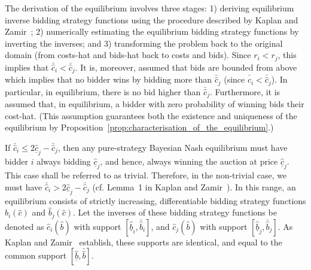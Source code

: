 The derivation of the equilibrium involves three stages: 1) deriving equilibrium inverse bidding strategy functions using the procedure described by Kaplan and Zamir~\cite{KaplanZamir2007}; 2) numerically estimating the equilibrium bidding strategy functions by inverting the inverses; and 3) transforming the problem back to the original domain (from costs-hat and bids-hat back to costs and bids). Since $r_i < r_j$, this implies that $\bar{\hat{c}}_i < \bar{\hat{c}}_j$. It is, moreover, assumed that bids are bounded from above which implies that no bidder wins by bidding more than $\bar{\hat{c}}_j$ (since $\bar{\hat{c}}_i < \bar{\hat{c}}_j$). In particular, in equilibrium, there is no bid higher than $\bar{\hat{c}}_j$. Furthermore, it is assumed that, in equilibrium, a bidder with zero probability of winning bids their cost-hat. (This assumption guarantees both the existence and uniqueness of the equilibrium by Proposition~\ref{prop:characterisation_of_the_equilibrium}.)

If $\bar{\hat{c}}_i \le 2\underline{\hat{c}}_j - \bar{\hat{c}}_j$, then any pure-strategy Bayesian Nash equilibrium must have bidder $i$ always bidding $\underline{\hat{c}}_j$, and hence, always winning the auction at price $\underline{\hat{c}}_j$. This case shall be referred to as trivial. Therefore, in the non-trivial case, we must have $\bar{\hat{c}}_i > 2\underline{\hat{c}}_j - \bar{\hat{c}}_j$ (cf. Lemma~1 in Kaplan and Zamir~\cite{KaplanZamir2007}). In this range, an equilibrium consists of strictly increasing, differentiable bidding strategy functions $\hat{b}_i(\hat{c})$ and $\hat{b}_j(\hat{c})$. Let the inverses of these bidding strategy functions be denoted as $\hat{c}_i(\hat{b})$ with support $[\underline{\hat{b}}_i, \bar{\hat{b}}_i]$, and $\hat{c}_j(\hat{b})$ with support $[\underline{\hat{b}}_j, \bar{\hat{b}}_j]$. As Kaplan and Zamir~\cite{KaplanZamir2007} establish, these supports are identical, and equal to the common support $[\underline{\hat{b}}, \bar{\hat{b}}]$.

